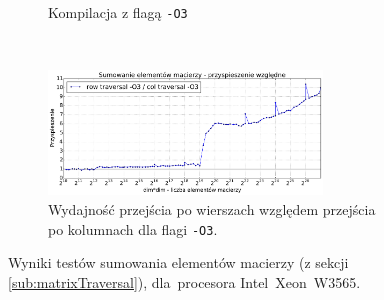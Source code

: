 \begin{figure}[!h]
\begin{subfigure}[c]{0.45\textwidth}
        \caption{Kompilacja z flagą \texttt{-O3}}
    \end{subfigure}
    \\
    \vspace{0.4cm}
    \begin{subfigure}[c]{1.0\textwidth}
        \centering
        \includegraphics[width=0.80\textwidth]{images/benchs_xeon/matrix_sum_normalized}
        \caption{Wydajność przejścia po wierszach względem przejścia po kolumnach dla flagi \texttt{-O3}.}
        \label{fig:matrixResultsO3Xeon}
    \end{subfigure}
    \caption{Wyniki testów sumowania elementów macierzy (z sekcji \ref{sub:matrixTraversal}), dla~procesora \mbox{Intel Xeon W3565}.}
    \label{fig:matrixResultsXeon}
\end{figure}


